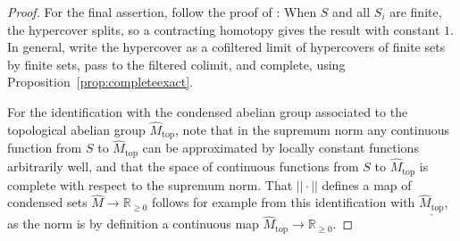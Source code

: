 \begin{proof}
For the final assertion, follow the proof of \cite[Theorem 3.3]{Condensed}: When $S$ and all $S_i$ are finite, the hypercover splits, so a contracting homotopy gives the result with constant $1$. In general, write the hypercover as a cofiltered limit of hypercovers of finite sets by finite sets, pass to the filtered colimit, and complete, using Proposition~\ref{prop:completeexact}.

For the identification with the condensed abelian group associated to the topological abelian group $\widehat{M}_{\mathrm{top}}$, note that in the supremum norm any continuous function from $S$ to $\widehat{M}_{\mathrm{top}}$ can be approximated by locally constant functions arbitrarily well, and that the space of continuous functions from $S$ to $\widehat{M}_{\mathrm{top}}$ is complete with respect to the supremum norm. That $||\cdot||$ defines a map of condensed sets $\widehat{M}\to \mathbb R_{\geq 0}$ follows for example from this identification with $\underline{\widehat{M}_{\mathrm{top}}}$, as the norm is by definition a continuous map $\widehat{M}_{\mathrm{top}}\to \mathbb R_{\geq 0}$.
\end{proof}










